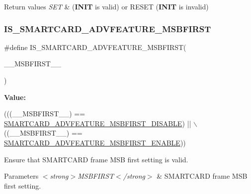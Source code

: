 \begin{DoxyRetVals}{Return values}
{\em S\+ET} & ({\bfseries I\+N\+IT} is valid) or R\+E\+S\+ET ({\bfseries I\+N\+IT} is invalid) \\
\hline
\end{DoxyRetVals}
\mbox{\label{group___s_m_a_r_t_c_a_r_d___private___macros_ga96b4e4e1136da35dd0c98a98767ede7c}} 
\subsubsection{\texorpdfstring{I\+S\+\_\+\+S\+M\+A\+R\+T\+C\+A\+R\+D\+\_\+\+A\+D\+V\+F\+E\+A\+T\+U\+R\+E\+\_\+\+M\+S\+B\+F\+I\+R\+ST}{IS\_SMARTCARD\_ADVFEATURE\_MSBFIRST}}
{\footnotesize\ttfamily \#define I\+S\+\_\+\+S\+M\+A\+R\+T\+C\+A\+R\+D\+\_\+\+A\+D\+V\+F\+E\+A\+T\+U\+R\+E\+\_\+\+M\+S\+B\+F\+I\+R\+ST(\begin{DoxyParamCaption}\item[{}]{\+\_\+\+\_\+\+M\+S\+B\+F\+I\+R\+S\+T\+\_\+\+\_\+ }\end{DoxyParamCaption})}

{\bfseries Value\+:}
\begin{DoxyCode}
(((\_\_MSBFIRST\_\_) == \hyperlink{group___s_m_a_r_t_c_a_r_d___m_s_b___first_ga08a9a4563e25f30e16c6eb29034200c8}{SMARTCARD\_ADVFEATURE\_MSBFIRST\_DISABLE}) || \(\backslash\)
                                                        ((\_\_MSBFIRST\_\_) == 
      \hyperlink{group___s_m_a_r_t_c_a_r_d___m_s_b___first_ga6ff42b7c97091818ee4a177a55c99cc2}{SMARTCARD\_ADVFEATURE\_MSBFIRST\_ENABLE}))
\end{DoxyCode}


Ensure that S\+M\+A\+R\+T\+C\+A\+RD frame M\+SB first setting is valid. 


\begin{DoxyParams}{Parameters}
{\em $<$strong$>$\+M\+S\+B\+F\+I\+R\+S\+T$<$/strong$>$} & S\+M\+A\+R\+T\+C\+A\+RD frame M\+SB first setting. \\
\hline
\end{DoxyParams}

